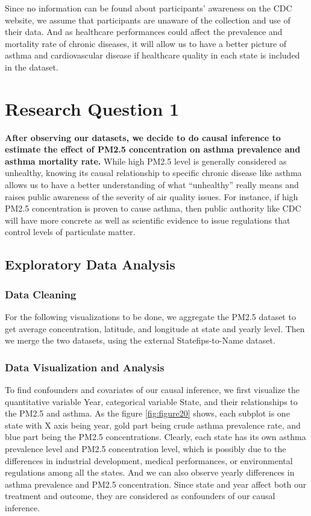 \documentclass{article}
\begin{document}
Since no information can be found about participants’ awareness on the CDC website, we assume that participants are unaware of the collection and use of their data. And as healthcare performances could affect the prevalence and mortality rate of chronic diseases, it will allow us to have a better picture of asthma and cardiovascular disease if healthcare quality in each state is included in the dataset.


\section{Research Question 1}
\textbf{After observing our datasets, we decide to do causal inference to estimate the effect of PM2.5 concentration on asthma prevalence and asthma mortality rate.}
While high PM2.5 level is generally considered as unhealthy, knowing its causal relationship to specific chronic disease like asthma allows us to have a better understanding of what “unhealthy” really means and raises public awareness of the severity of air quality issues. For instance, if high PM2.5 concentration is proven to cause asthma, then public authority like CDC will have more concrete as well as scientific evidence to issue regulations that control levels of particulate matter. 

\subsection{Exploratory Data Analysis}
\subsubsection{Data Cleaning}
For the following visualizations to be done, we aggregate the PM2.5 dataset to get average concentration, latitude, and longitude at state and yearly level. Then we merge the two datasets, using the external Statefips-to-Name dataset.

\subsubsection{Data Visualization and Analysis}
To find confounders and covariates of our causal inference, we first visualize the quantitative variable Year, categorical variable State, and their relationships to the PM2.5 and asthma. As the figure \ref{fig:figure20} shows, each subplot is one state with X axis being year, gold part being crude asthma prevalence rate, and blue part being the PM2.5 concentrations. Clearly, each state has its own asthma prevalence level and PM2.5 concentration level, which is possibly due to the differences in industrial development, medical performances, or environmental regulations among all the states. And we can also observe yearly differences in asthma prevalence and PM2.5 concentration. Since state and year affect both our treatment and outcome, they are considered as confounders of our causal inference. 
\end{document}

